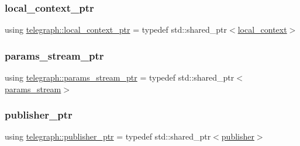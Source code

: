 \mbox{\label{namespacetelegraph_ab59c7b38d99a98b4acc22433c920b1e6}} 
\subsubsection{\texorpdfstring{local\+\_\+context\+\_\+ptr}{local\_context\_ptr}}
{\footnotesize\ttfamily using \hyperlink{namespacetelegraph_ab59c7b38d99a98b4acc22433c920b1e6}{telegraph\+::local\+\_\+context\+\_\+ptr} = typedef std\+::shared\+\_\+ptr$<$\hyperlink{classtelegraph_1_1local__context}{local\+\_\+context}$>$}

\mbox{\label{namespacetelegraph_ad071241508ea0f86c7de0686016f9ca9}} 
\subsubsection{\texorpdfstring{params\+\_\+stream\+\_\+ptr}{params\_stream\_ptr}}
{\footnotesize\ttfamily using \hyperlink{namespacetelegraph_ad071241508ea0f86c7de0686016f9ca9}{telegraph\+::params\+\_\+stream\+\_\+ptr} = typedef std\+::shared\+\_\+ptr$<$\hyperlink{classtelegraph_1_1params__stream}{params\+\_\+stream}$>$}

\mbox{\label{namespacetelegraph_aff5109352406dd9a8cd38f431f808bc5}} 
\subsubsection{\texorpdfstring{publisher\+\_\+ptr}{publisher\_ptr}}
{\footnotesize\ttfamily using \hyperlink{namespacetelegraph_aff5109352406dd9a8cd38f431f808bc5}{telegraph\+::publisher\+\_\+ptr} = typedef std\+::shared\+\_\+ptr$<$\hyperlink{classtelegraph_1_1publisher}{publisher}$>$}

\mbox{\label{namespacetelegraph_a201160a557b56b424ce605263acdb0ae}} 
